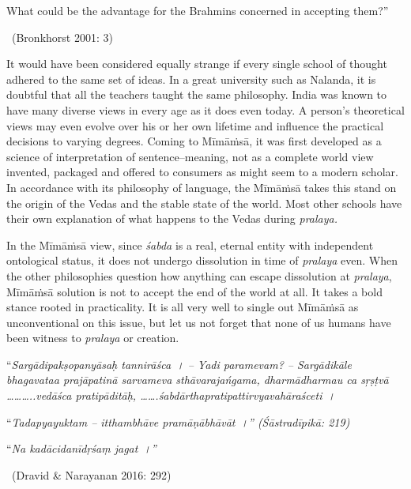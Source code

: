 \begin{myquote}
What could be the advantage for the Brahmins concerned in accepting them?” 

~\hfill (Bronkhorst 2001: 3)
\end{myquote}

It would have been considered equally strange if every single school of thought adhered to the same set of ideas. In a great university such as Nalanda, it is doubtful that all the teachers taught the same philosophy. India was known to have many diverse views in every age as it does even today. A person’s theoretical views may even evolve over his or her own lifetime and influence the practical decisions to varying degrees. Coming to Mīmāṁsā, it was first developed as a science of interpretation of sentence–meaning, not as a complete world view invented, packaged and offered to consumers as might seem to a modern scholar. In accordance with its philosophy of language, the Mīmāṁsā takes this stand on the origin of the Vedas and the stable state of the world. Most other schools have their own explanation of what happens to the Vedas during \textit{pralaya.}

In the Mīmāṁsā view, since \textit{śabda} is a real, eternal entity with independent ontological status, it does not undergo dissolution in time of \textit{pralaya} even. When the other philosophies question how anything can escape dissolution at \textit{pralaya}, Mīmāṁsā solution is not to accept the end of the world at all. It takes a bold stance rooted in practicality. It is all very well to single out Mīmāṁsā as unconventional on this issue, but let us not forget that none of us humans have been witness to \textit{pralaya} or creation.

\begin{myquote}
“\textit{Sargādipakṣopanyāsaḥ tannirāśca~। – Yadi paramevam? – Sargādikāle bhagavataa prajāpatinā sarvameva sthāvarajańgama, dharmādharmau ca sŗṣṭvā ………..vedāśca pratipāditāḥ, …….śabdārthapratipattirvyavahāraśceti~।}
\end{myquote}

\begin{myquote}
“\textit{Tadapyayuktam – itthambhāve pramāṇābhāvāt~।” (Śāstradīpikā: 219)}
\end{myquote}

\begin{myquote}
“\textit{Na kadācidanīdṛśaṃ jagat~।”}

~\hfill (Dravid \& Narayanan 2016: 292)
\end{myquote}

